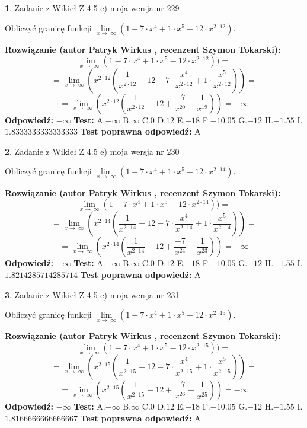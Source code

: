 \documentclass[12pt, a4paper]{article}
\theoremstyle{definition} %
\newtheorem{zad}{}
\newcommand{\zadStart}[1]{\begin{zad}#1\newline}
\newcommand{\zadStop}{\end{zad}}
\newcommand{\rozwStart}[2]{\noindent \textbf{Rozwiązanie (autor #1 , recenzent #2): }\newline}
\newcommand{\rozwStop}{\newline}
\newcommand{\odpStart}{\noindent \textbf{Odpowiedź:}\newline}
\newcommand{\odpStop}{\newline}
\newcommand{\testStart}{\noindent \textbf{Test:}\newline}
\newcommand{\testStop}{\newline}
\newcommand{\kluczStart}{\noindent \textbf{Test poprawna odpowiedź:}\newline}
\newcommand{\kluczStop}{\newline}
\begin{document}
\zadStart{Zadanie z Wikieł Z 4.5 e) moja wersja nr 229}


Obliczyć granicę funkcji  $\lim\limits_{x\to\ \infty}(1 - 7 \cdot x^{4}+1 \cdot x^{5}- 12 \cdot x^{2\cdot12})$.
\zadStop
\rozwStart{Patryk Wirkus}{Szymon Tokarski}
$$\lim\limits_{x\to\ \infty}(1 - 7 \cdot x^{4}+1 \cdot x^{5}- 12 \cdot x^{2\cdot12}))=$$
$$=\lim\limits_{x\to\ \infty}(x^{2\cdot12}(\frac{1}{x^{2\cdot12}}-12 -7 \cdot \frac{x^{4}}{x^{2\cdot12}}+1 \cdot \frac{x^{5}}{x^{2\cdot12}}))=$$
$$=\lim\limits_{x\to\ \infty}(x^{2\cdot12}(\frac{1}{x^{2\cdot12}}-12 + \frac{-7}{x^{20}}+ \frac{1}{x^{19}}))=-\infty$$
\rozwStop
\odpStart
$-\infty$
\odpStop
\testStart
A.$-\infty$ B.$\infty$ C.$0$ D.$12$ E.$-18$
F.$-10.05$ G.$-12$
H.$-1.55$
I.$1.8333333333333333$
\testStop
\kluczStart
A
\kluczStop



\zadStart{Zadanie z Wikieł Z 4.5 e) moja wersja nr 230}


Obliczyć granicę funkcji  $\lim\limits_{x\to\ \infty}(1 - 7 \cdot x^{4}+1 \cdot x^{5}- 12 \cdot x^{2\cdot14})$.
\zadStop
\rozwStart{Patryk Wirkus}{Szymon Tokarski}
$$\lim\limits_{x\to\ \infty}(1 - 7 \cdot x^{4}+1 \cdot x^{5}- 12 \cdot x^{2\cdot14}))=$$
$$=\lim\limits_{x\to\ \infty}(x^{2\cdot14}(\frac{1}{x^{2\cdot14}}-12 -7 \cdot \frac{x^{4}}{x^{2\cdot14}}+1 \cdot \frac{x^{5}}{x^{2\cdot14}}))=$$
$$=\lim\limits_{x\to\ \infty}(x^{2\cdot14}(\frac{1}{x^{2\cdot14}}-12 + \frac{-7}{x^{24}}+ \frac{1}{x^{23}}))=-\infty$$
\rozwStop
\odpStart
$-\infty$
\odpStop
\testStart
A.$-\infty$ B.$\infty$ C.$0$ D.$12$ E.$-18$
F.$-10.05$ G.$-12$
H.$-1.55$
I.$1.8214285714285714$
\testStop
\kluczStart
A
\kluczStop



\zadStart{Zadanie z Wikieł Z 4.5 e) moja wersja nr 231}


Obliczyć granicę funkcji  $\lim\limits_{x\to\ \infty}(1 - 7 \cdot x^{4}+1 \cdot x^{5}- 12 \cdot x^{2\cdot15})$.
\zadStop
\rozwStart{Patryk Wirkus}{Szymon Tokarski}
$$\lim\limits_{x\to\ \infty}(1 - 7 \cdot x^{4}+1 \cdot x^{5}- 12 \cdot x^{2\cdot15}))=$$
$$=\lim\limits_{x\to\ \infty}(x^{2\cdot15}(\frac{1}{x^{2\cdot15}}-12 -7 \cdot \frac{x^{4}}{x^{2\cdot15}}+1 \cdot \frac{x^{5}}{x^{2\cdot15}}))=$$
$$=\lim\limits_{x\to\ \infty}(x^{2\cdot15}(\frac{1}{x^{2\cdot15}}-12 + \frac{-7}{x^{26}}+ \frac{1}{x^{25}}))=-\infty$$
\rozwStop
\odpStart
$-\infty$
\odpStop
\testStart
A.$-\infty$ B.$\infty$ C.$0$ D.$12$ E.$-18$
F.$-10.05$ G.$-12$
H.$-1.55$
I.$1.8166666666666667$
\testStop
\kluczStart
A
\kluczStop
\end{document}
